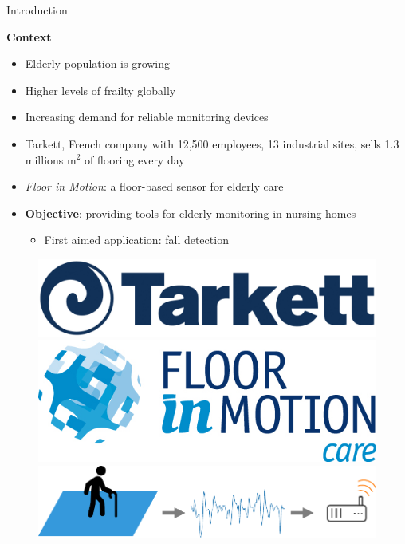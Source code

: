 \documentclass[9pt,t,aspectratio=1610]{beamer}
\newcommand{\myemph}[1]{\textcolor{myblue}{#1}}
\begin{document}
\begin{frame}{Introduction}
\begin{minipage}[t]{\linewidth}
    \begin{minipage}[t]{0.5\linewidth}
        \textbf{Context}
        \begin{itemize}
            \item Elderly population is growing
            \item Higher levels of frailty globally
            \item Increasing demand for reliable monitoring devices
            \item Tarkett, French company with 12,500 employees, 13 industrial sites, sells 1.3 millions m$^2$ of flooring every day
            \item \emph{Floor in Motion}: a floor-based sensor for elderly care
            \item \textbf{Objective}: providing tools for elderly monitoring in nursing homes
            \begin{itemize}
                \item First aimed application: fall detection
            \end{itemize}
        \end{itemize}
    \end{minipage}
    \begin{minipage}[t]{0.5\linewidth}
        \begin{figure}[h]
                \centering
                \vspace{1cm}
                \includegraphics[width=0.4\linewidth]{Tarkett-logo_red.jpg}\\[5pt]
                \includegraphics[width=0.4\linewidth]{FIM.jpg}\\[15pt]
                \includegraphics[width=0.95\linewidth]{schema_fall_detector.pdf}\\

\end{figure}
\end{minipage}
\end{minipage}
\end{frame}
\end{document}
